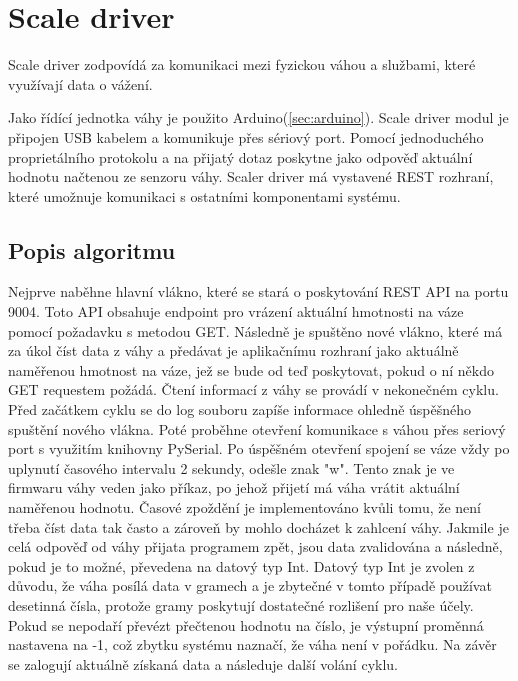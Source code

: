 \section{Scale driver}\label{sec:scale-driver}
Scale driver zodpovídá za komunikaci mezi fyzickou váhou a službami, které využívají data o vážení.\newline

Jako řídící jednotka váhy je použito Arduino(\ref{sec:arduino}).
Scale driver modul je připojen USB kabelem a komunikuje přes sériový port.
Pomocí jednoduchého proprietálního protokolu a na přijatý dotaz poskytne jako odpověď aktuální hodnotu načtenou ze senzoru váhy.
Scaler driver má vystavené REST rozhraní, které umožnuje komunikaci s ostatními komponentami systému.

\subsection*{Popis algoritmu}
Nejprve naběhne hlavní vlákno, které se stará o poskytování REST API na portu 9004.
Toto API obsahuje endpoint pro vrázení aktuální hmotnosti na váze pomocí požadavku s metodou GET.
Následně je spuštěno nové vlákno, které má za úkol číst data z váhy a předávat je aplikačnímu rozhraní jako aktuálně naměřenou hmotnost na váze, jež se bude od teď poskytovat, pokud o ní někdo GET requestem požádá.
Čtení informací z váhy se provádí v nekonečném cyklu.
Před začátkem cyklu se do log souboru zapíše informace ohledně úspěšného spuštění nového vlákna.
Poté proběhne otevření komunikace s váhou přes seriový port s využitím knihovny PySerial.
Po úspěšném otevření spojení se váze vždy po uplynutí časového intervalu 2 sekundy, odešle znak "w".
Tento znak je ve firmwaru váhy veden jako příkaz, po jehož přijetí má váha vrátit aktuální naměřenou hodnotu.
Časové zpoždění je implementováno kvůli tomu, že není třeba číst data tak často a zároveň by mohlo docházet k zahlcení váhy.
Jakmile je celá odpověď od váhy přijata programem zpět, jsou data zvalidována a následně, pokud je to možné, převedena na datový typ Int.
Datový typ Int je zvolen z důvodu, že váha posílá data v gramech a je zbytečné v tomto případě používat desetinná čísla, protože gramy poskytují dostatečné rozlišení pro naše účely.
Pokud se nepodaří převézt přečtenou hodnotu na číslo, je výstupní proměnná nastavena na -1, což zbytku systému naznačí, že váha není v pořádku.
Na závěr se zalogují aktuálně získaná data a následuje další volání cyklu.


